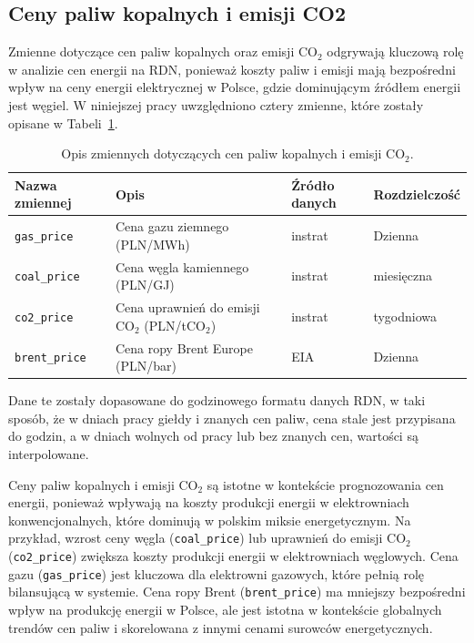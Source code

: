 \subsection{Ceny paliw kopalnych i emisji CO2}
\label{subsec:prices}

Zmienne dotyczące cen paliw kopalnych oraz emisji CO$_2$ odgrywają kluczową rolę w analizie cen energii na RDN, ponieważ koszty paliw i emisji mają bezpośredni wpływ na ceny energii elektrycznej w Polsce, gdzie dominującym źródłem energii jest węgiel. W niniejszej pracy uwzględniono cztery zmienne, które zostały opisane w Tabeli~\ref{tab:fuel_variables}.

\begin{table}[H]
    \centering
    \begin{tabular}{|l|l|l|l|}
    \hline
    \textbf{Nazwa zmiennej} & \textbf{Opis} & \textbf{Źródło danych} & \textbf{Rozdzielczość} \\ \hline
    \texttt{gas\_price}     & Cena gazu ziemnego (PLN/MWh) & instrat \cite{INSTRAT_ENERGY} & Dzienna \\ \hline
    \texttt{coal\_price}    & Cena węgla kamiennego (PLN/GJ) & instrat \cite{INSTRAT_ENERGY} & miesięczna \\ \hline
    \texttt{co2\_price}     & Cena uprawnień do emisji CO$_2$ (PLN/tCO$_2$) & instrat \cite{INSTRAT_ENERGY} & tygodniowa \\ \hline
    \texttt{brent\_price}   & Cena ropy Brent Europe (PLN/bar) & EIA \cite{EIA} & Dzienna \\ \hline
    \end{tabular}
    \caption{Opis zmiennych dotyczących cen paliw kopalnych i emisji CO$_2$.}
    \label{tab:fuel_variables}
\end{table}

Dane te zostały dopasowane do godzinowego formatu danych RDN, w taki sposób, że w dniach pracy giełdy i znanych cen paliw, cena stale jest przypisana do godzin, a w dniach wolnych od pracy lub bez znanych cen, wartości są interpolowane. 

Ceny paliw kopalnych i emisji CO$_2$ są istotne w kontekście prognozowania cen energii, ponieważ wpływają na koszty produkcji energii w elektrowniach konwencjonalnych, które dominują w polskim miksie energetycznym. Na przykład, wzrost ceny węgla (\texttt{coal\_price}) lub uprawnień do emisji CO$_2$ (\texttt{co2\_price}) zwiększa koszty produkcji energii w elektrowniach węglowych. Cena gazu (\texttt{gas\_price}) jest kluczowa dla elektrowni gazowych, które pełnią rolę bilansującą w systemie. Cena ropy Brent (\texttt{brent\_price}) ma mniejszy bezpośredni wpływ na produkcję energii w Polsce, ale jest istotna w kontekście globalnych trendów cen paliw i skorelowana z innymi cenami surowców energetycznych.

